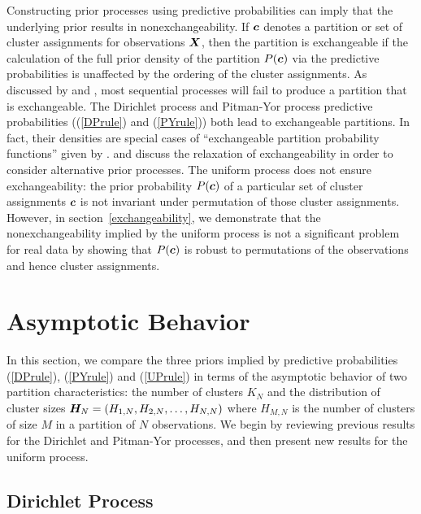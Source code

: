\documentclass[twoside]{article}
\begin{document}
Constructing prior processes using predictive probabilities can imply
that the underlying prior results in nonexchangeability. If $\boldsymbol{c}$
denotes a partition or set of cluster assignments for observations
$\boldsymbol{X}$, then the partition is exchangeable if the calculation of the
full prior density of the partition $P(\boldsymbol{c})$ via the predictive
probabilities is unaffected by the ordering of the cluster
assignments. As discussed by \cite{Pit96} and \cite{Pit02}, most
sequential processes will fail to produce a partition that is
exchangeable.  The Dirichlet process and Pitman-Yor process predictive
probabilities ((\ref{DPrule}) and (\ref{PYrule})) both lead to
exchangeable partitions. In fact, their densities are special cases of
``exchangeable partition probability functions'' given by
\cite{IshJam03}.  \cite{GreRic01} and \cite{Wel06} discuss the
relaxation of exchangeability in order to consider alternative prior
processes. The uniform process does not ensure exchangeability: the
prior probability $P(\boldsymbol{c})$ of a particular set of cluster assignments
$\boldsymbol{c}$ is not invariant under permutation of those cluster
assignments. However, in section~\ref{exchangeability}, we demonstrate
that the nonexchangeability implied by the uniform process is not a
significant problem for real data by showing that $P(\boldsymbol{c})$ is robust
to permutations of the observations and hence cluster assignments.

\section{Asymptotic Behavior}
\label{asymptotics}

In this section, we compare the three priors implied by predictive
probabilities (\ref{DPrule}), (\ref{PYrule}) and (\ref{UPrule}) in
terms of the asymptotic behavior of two partition characteristics: the
number of clusters $K_N$ and the distribution of cluster sizes $\boldsymbol{H}_N
= (H_{1,N}, H_{2,N}, \ldots, H_{N,N})$ where $H_{M,N}$ is the number
of clusters of size $M$ in a partition of $N$ observations.  We begin
by reviewing previous results for the Dirichlet and Pitman-Yor
processes, and then present new results for the uniform process.

\subsection{Dirichlet
  Process} \label{DP_asymptotic}
\end{document}
